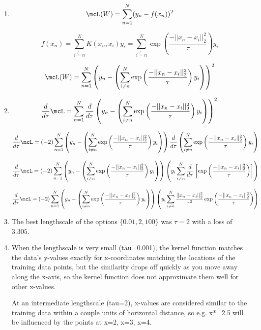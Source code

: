 \documentclass[submit]{harvardml}
\begin{document}
\begin{enumerate}

\item $$\mcL(W) = \sum_{n=1}^{N} (y_n - f(x_n))^2$$
  
  $$ f(x_n) = \sum_{i \not{=} n}^{N} K(x_n,x_i) y_i = \sum_{i \not{=} n}^{N}  \exp\left(\frac{-||x_n-x_i||^2_2}{\tau}\right) y_i $$
  
  $$\mcL(W) = \sum_{n=1}^{N} \left(y_n - \left(\sum_{i \not{=} n}^{N}  \exp\left(\frac{-||x_n-x_i||^2_2}{\tau}\right) y_i\right)\right)^2$$



\item $$ \frac{d}{d\tau}\mcL = \sum_{n=1}^{N} \frac{d}{d\tau} \left(y_n - \left(\sum_{i \not{=} n}^{N}  \exp\left(\frac{-||x_n-x_i||^2_2}{\tau}\right) y_i\right)\right)^2 $$

$$ \frac{d}{d\tau}\mcL = (-2) \sum_{n=1}^{N} \left(y_n - \left(\sum_{i \not{=} n}^{N}  \exp\left(\frac{-||x_n-x_i||^2_2}{\tau}\right) y_i\right)\right) \frac{d}{d\tau} \left(\sum_{i \not{=} n}^{N}  \exp\left(\frac{-||x_n-x_i||^2_2}{\tau}\right) y_i\right) $$

$$ \frac{d}{d\tau}\mcL = (-2) \sum_{n=1}^{N} \left(y_n - \left(\sum_{i \not{=} n}^{N}  \exp\left(\frac{-||x_n-x_i||^2_2}{\tau}\right) y_i\right)\right) \left( y_i \sum_{i \not{=} n}^{N}  \frac{d}{d\tau}\left[ \exp\left(\frac{-||x_n-x_i||^2_2}{\tau}\right)\right] \right) $$

$$ \frac{d}{d\tau}\mcL = (-2) \sum_{n=1}^{N} \left(y_n - \left(\sum_{i \not{=} n}^{N}  \exp\left(\frac{-||x_n-x_i||^2_2}{\tau}\right) y_i\right)\right) \left( y_i \sum_{i \not{=} n}^{N}  \frac{||x_n-x_i||^2_2}{\tau^2} \exp\left(\frac{-||x_n-x_i||^2_2}{\tau}\right) \right) $$

\item The best lengthscale of the options $\{0.01, 2, 100\}$ was $\tau = 2$ with a loss of $3.305$.
  
\item When the lengthscale is very small (tau=0.001), the kernel function matches the data's y-values exactly for x-coordinates matching the locations of the training data points, but the similarity drops off quickly as you move away along the x-axis, so the kernel function does not approximate them well for other x-values.
  
  At an intermediate lengthscale (tau=2), x-values are considered similar to the training data within a couple units of horizontal distance, so e.g. x*=2.5 will be influenced by the points at x=2, x=3, x=4.
  

\end{enumerate}
\end{document}
